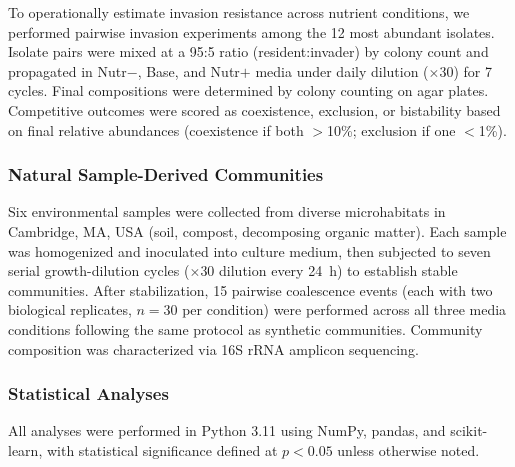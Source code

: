 To operationally estimate invasion resistance across nutrient conditions, we performed pairwise invasion experiments among the 12 most abundant isolates. Isolate pairs were mixed at a 95:5 ratio (resident:invader) by colony count and propagated in Nutr$-$, Base, and Nutr$+$ media under daily dilution ($\times$30) for 7 cycles. Final compositions were determined by colony counting on agar plates. Competitive outcomes were scored as coexistence, exclusion, or bistability based on final relative abundances (coexistence if both $>$10\%; exclusion if one $<$1\%). 


\subsubsection*{Natural Sample-Derived Communities}
\label{sec:suppl:natural}

Six environmental samples were collected from diverse microhabitats in Cambridge, MA, USA (soil, compost, decomposing organic matter). Each sample was homogenized and inoculated into culture medium, then subjected to seven serial growth-dilution cycles ($\times$30 dilution every 24~h) to establish stable communities. After stabilization, 15 pairwise coalescence events (each with two biological replicates, $n = 30$ per condition) were performed across all three media conditions following the same protocol as synthetic communities. Community composition was characterized via 16S rRNA amplicon sequencing.


\subsubsection*{Statistical Analyses}
\label{sec:suppl:statistics}

All analyses were performed in Python 3.11 using NumPy, pandas, and scikit-learn, with statistical significance defined at $p < 0.05$ unless otherwise noted.

